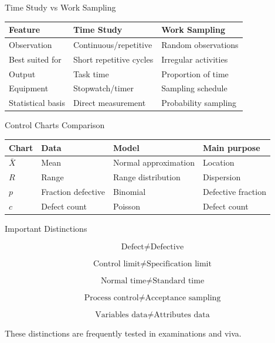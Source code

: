 \documentclass[aspectratio=169,10pt]{beamer}
\begin{document}

\begin{frame}[shrink=18]{Time Study vs Work Sampling}
\small

\begin{tabularx}{\textwidth}{YYY}
\toprule
Feature & Time Study & Work Sampling\\
\midrule
Observation & Continuous/repetitive & Random observations\\
Best suited for & Short repetitive cycles & Irregular activities\\
Output & Task time & Proportion of time\\
Equipment & Stopwatch/timer & Sampling schedule\\
Statistical basis & Direct measurement & Probability sampling\\
\bottomrule
\end{tabularx}

\end{frame}


\begin{frame}[shrink=18]{Control Charts Comparison}
\small

\begin{tabularx}{\textwidth}{YYYY}
\toprule
Chart & Data & Model & Main purpose\\
\midrule
$\bar X$ & Mean & Normal approximation & Location\\
$R$ & Range & Range distribution & Dispersion\\
$p$ & Fraction defective & Binomial & Defective fraction\\
$c$ & Defect count & Poisson & Defect count\\
\bottomrule
\end{tabularx}

\end{frame}


\begin{frame}[shrink=18]{Important Distinctions}
\small

\[
\boxed{
\text{Defect}\neq\text{Defective}
}
\]

\[
\boxed{
\text{Control limit}\neq\text{Specification limit}
}
\]

\[
\boxed{
\text{Normal time}\neq\text{Standard time}
}
\]

\[
\boxed{
\text{Process control}\neq\text{Acceptance sampling}
}
\]

\[
\boxed{
\text{Variables data}\neq\text{Attributes data}
}
\]

These distinctions are frequently tested in examinations and viva.

\end{frame}
\end{document}
